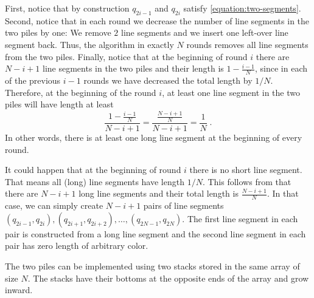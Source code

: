 \documentclass{article}
\begin{document}
First, notice that by construction $q_{2i-1}$ and $q_{2i}$ satisfy
\eqref{equation:two-segments}.  Second, notice that in each round we decrease
the number of line segments in the two piles by one: We remove $2$ line
segments and we insert one left-over line segment back. Thus, the algorithm in
exactly $N$ rounds removes all line segments from the two piles. Finally,
notice that at the beginning of round $i$ there are $N-i+1$ line segments in
the two piles and their length is $1 - \frac{i-1}{N}$, since in each of the
previous $i-1$ rounds we have decreased the total length by $1/N$. Therefore,
at the beginning of the round $i$, at least one line segment in the two piles
will have length at least
$$
\frac{1 - \frac{i-1}{N}}{N - i + 1}
= \frac{\frac{N - i + 1}{N}}{N - i + 1}
= \frac{1}{N} \; .
$$
In other words, there is at least one long line segment at the beginning of
every round.

It could happen that at the beginning of round $i$ there is no short line
segment.  That means all (long) line segments have length $1/N$. This follows
from that there are $N-i+1$ long line segments and their total length is
$\frac{N-i+1}{N}$. In that case, we can simply create $N-i+1$ pairs of line
segments $(q_{2i-1}, q_{2i}), (q_{2i+1}, q_{2i+2}), \dots, (q_{2N-1}, q_{2N})$.
The first line segment in each pair is constructed from a long line segment and
the second line segment in each pair has zero length of arbitrary color.

The two piles can be implemented using two stacks stored in the same array of
size $N$.  The stacks have their bottoms at the opposite ends of the array and
grow inward.



\end{document}
